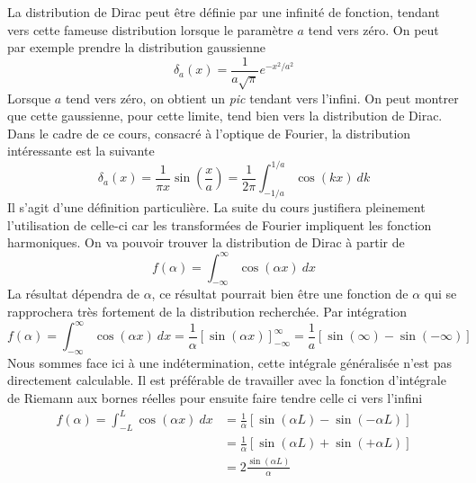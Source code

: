 La distribution de Dirac peut être définie par une infinité de fonction, tendant 
vers cette fameuse distribution lorsque le paramètre $a$ tend vers zéro. On peut 
par exemple prendre la distribution gaussienne 
\begin{equation}
\delta_a(x) = \frac{1}{a\sqrt{\pi}}e^{-x^2/a^2}  
\end{equation}
Lorsque $a$ tend vers zéro, on obtient un \textit{pic} tendant vers l'infini. On 
peut montrer que cette gaussienne, pour cette limite, tend bien vers la distribution 
de Dirac. Dans le cadre de ce cours, consacré à l'optique de Fourier, la distribution 
intéressante est la suivante
\begin{equation}
\delta_a(x) = \frac{1}{\pi x}\sin\left(\frac{x}{a}\right) = \frac{1}{2\pi}\int_{-1/a}^{1/a}
\cos(kx)\ dk
\end{equation}
Il s'agit d'une définition particulière. La suite du cours justifiera pleinement 
l'utilisation de celle-ci car les transformées de Fourier impliquent les fonction 
harmoniques. On va pouvoir trouver la distribution de Dirac à partir de
\begin{equation}
f(\alpha) = \int_{-\infty}^{\infty} \cos(\alpha x)\ dx
\end{equation}
La résultat dépendra de $\alpha$, ce résultat pourrait bien être une fonction de 
$\alpha$ qui se rapprochera très fortement de la distribution recherchée. Par 
intégration
\begin{equation}
f(\alpha) = \int_{-\infty}^{\infty} \cos(\alpha x)\ dx = \frac{1}{\alpha}\left[
\sin(\alpha x)\right]^\infty_{-\infty} = \frac{1}{a}[\sin(\infty)-\sin(-\infty)]
\end{equation}
Nous sommes face ici à une indétermination, cette intégrale généralisée n'est pas 
directement calculable. Il est préférable de travailler avec la fonction d'intégrale 
de Riemann aux bornes réelles pour ensuite faire tendre celle ci vers l'infini
\begin{equation}
\begin{array}{ll}
f(\alpha) = \int_{-L}^L \cos(\alpha x)\ dx &= \frac{1}{\alpha}[\sin(\alpha L)-\sin(-\alpha 
L)]\\
&= \frac{1}{\alpha}[\sin(\alpha L)+\sin(+\alpha L)]\\
&= 2\frac{\sin(\alpha L)}{\alpha}
\end{array}
\end{equation}

